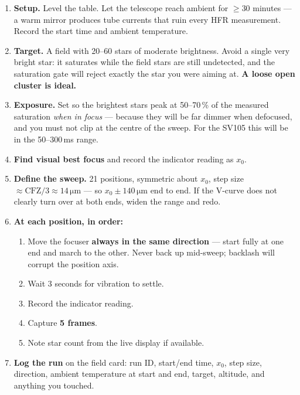 \documentclass[11pt]{article}
\begin{document}
\begin{enumerate}
\item \textbf{Setup.} Level the table. Let the telescope reach ambient for
      $\geq$30 minutes --- a warm mirror produces tube currents that ruin every
      HFR measurement. Record the start time and ambient temperature.

\item \textbf{Target.} A field with 20--60 stars of moderate brightness. Avoid
      a single very bright star: it saturates while the field stars are still
      undetected, and the saturation gate will reject exactly the star you were
      aiming at. \textbf{A loose open cluster is ideal.}

\item \textbf{Exposure.} Set so the brightest stars peak at 50--70\,\% of the
      measured saturation \emph{when in focus} --- because they will be far
      dimmer when defocused, and you must not clip at the centre of the sweep.
      For the SV105 this will be in the 50--300\,ms range.

\item \textbf{Find visual best focus} and record the indicator reading as
      $x_0$.

\item \textbf{Define the sweep.} 21 positions, symmetric about $x_0$, step size
      $\approx \mathrm{CFZ}/3 \approx 14\,\mathrm{\mu m}$ --- so
      $x_0 \pm 140\,\mathrm{\mu m}$ end to end. If the V-curve does not clearly
      turn over at both ends, widen the range and redo.

\item \textbf{At each position, in order:}
      \begin{enumerate}[label=\alph*.]
      \item Move the focuser \textbf{always in the same direction} --- start
            fully at one end and march to the other. Never back up mid-sweep;
            backlash will corrupt the position axis.
      \item Wait 3 seconds for vibration to settle.
      \item Record the indicator reading.
      \item Capture \textbf{5 frames}.
      \item Note star count from the live display if available.
      \end{enumerate}

\item \textbf{Log the run} on the field card: run ID, start/end time, $x_0$,
      step size, direction, ambient temperature at start and end, target,
      altitude, and anything you touched.


\end{enumerate}
\end{document}
